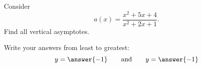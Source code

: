 \documentclass{ximera}
\author{Bart Snapp}
\begin{document}
\begin{exercise}
Consider 
\[a(x) = \frac{x^2+5 x+4}{x^2+2 x+1}.
\]
Find all vertical asymptotes.
\begin{prompt}
\begin{multipleChoice}
\end{multipleChoice}
\begin{exercise}Write your answers from least to greatest:
\[
y=\answer{-1}\qquad\text{and}\qquad y=\answer{-1}
\]
\end{exercise}
\end{prompt}
\end{exercise}
\end{document}
